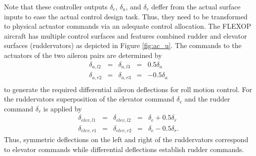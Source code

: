 \documentclass[aerospace,article,submit,moreauthors,pdftex,10pt,a4paper]{Definitions/mdpi}
\begin{document}
Note that these controller outputs $\delta_e$, $\delta_a$, and $\delta_r$ deffer from the actual surface inputs to ease the actual control design task. Thus, they need to be transformed to physical actuator commands via an adequate control allocation.
The FLEXOP aircraft has multiple control surfaces and features combined rudder and elevator surfaces (ruddervators) as depicted in Figure \ref{fig:ac_u}. The commands to the actuators of the two aileron pairs are determined by
\begin{equation}\label{eq:CAail}
\begin{array}{rclcr}
\delta_{a,l2} &=& \delta_{a,l3} &=&  0.5 \delta_{a} \\
\delta_{a,r2} &=& \delta_{a,r3} &=&  -0.5 \delta_{a} \\
\end{array}
\end{equation}
to generate the required differential aileron deflections for roll motion control. For the ruddervators superposition of the elevator command $\delta_e$ and the rudder command $\delta_r$ is applied by
\begin{equation}\label{eq:CAelev}
\begin{array}{rclcl}
\delta_{elev,l1} &=& \delta_{elev,l2} &=&  \delta_e + 0.5 \delta_r \\
\delta_{elev,r1} &=& \delta_{elev,r2}  &=& \delta_e - 0.5 \delta_r.
\end{array}
\end{equation}
Thus, symmetric deflections on the left and right of the ruddervators correspond to elevator commands while differential deflections establish rudder commands.
\end{document}
